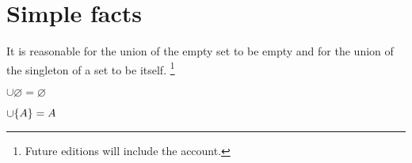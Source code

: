 \section*{Simple facts}

It is reasonable for the union of the empty set to be empty and for the union of the singleton of a set to be itself.
  \ifhmode\unskip\fi\footnote{
Future editions will include the account.
  }

\begin{proposition}$\cup \varnothing = \varnothing$\end{proposition}


\begin{proposition}$\cup \{A\} = A$\end{proposition}

